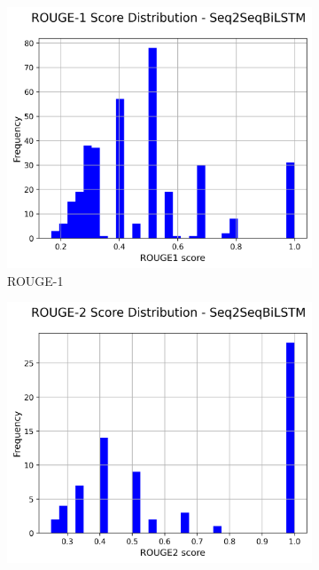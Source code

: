 \documentclass[a4paper, 12pt]{article}
\begin{document}
\begin{figure}[H]
    \centering
    \begin{subfigure}{0.32\textwidth}
        \centering
        \includegraphics[width=\textwidth]{media/Seq2SeqBiLSTM_rouge1_scores.png}
        \caption{ROUGE-1}
        \label{fig:biLSTM_rouge_1}
    \end{subfigure}
    \hfill
    \begin{subfigure}{0.32\textwidth}
        \centering
        \includegraphics[width=\textwidth]{media/Seq2SeqBiLSTM_rouge2_scores.png}

\end{subfigure}
\end{figure}
\end{document}
